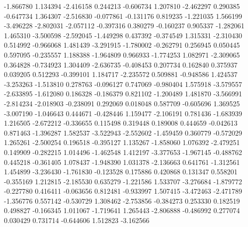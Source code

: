 -1.866780
1.134394
-2.416158
0.244213
-0.606734
1.207810
-2.462297
0.290385
-0.647734
1.364307
-2.516830
-0.077861
-0.131176
0.819235
-1.221035
1.566199
-3.496228
-2.802031
-2.057112
-0.397316
0.380279
-0.160237
0.905337
-1.282061
1.465310
-3.500598
-2.592045
-1.449298
0.437392
-0.374549
1.315331
-2.310430
0.514992
-0.966068
1.481439
-3.291915
-1.780002
-0.262791
0.256945
0.050445
0.597095
-0.235557
1.188388
-1.964809
0.966933
-1.774253
1.082971
-2.309065
0.364828
-0.734923
1.304409
-2.636735
-0.408453
0.207734
0.162840
0.375937
0.039205
0.512293
-0.399101
1.184717
-2.235572
0.509881
-0.948586
1.424537
-3.253263
-1.513810
0.278763
-0.096127
0.747069
-0.980404
1.575918
-3.579557
-2.633895
-1.612080
0.186328
-0.186379
0.821102
-1.200489
1.481870
-3.566991
-2.814234
-2.018903
-0.238091
0.292069
0.018048
0.587709
-0.605696
1.369525
-3.007190
-1.046643
0.444671
-0.428446
1.159477
-2.106191
0.781436
-1.683939
1.216505
-2.672212
-0.336655
0.115498
0.319448
0.189008
0.444659
-0.042613
0.871463
-1.396287
1.582537
-3.522943
-2.552602
-1.459459
0.360779
-0.572029
1.265261
-2.500254
0.196518
-0.395127
1.135267
-1.858060
1.076392
-2.479251
0.149909
-0.282215
1.014496
-1.462548
1.412197
-3.377653
-1.967145
-0.488762
0.445218
-0.361405
1.078437
-1.948390
1.031378
-2.136663
0.641761
-1.312561
1.454899
-3.236430
-1.761830
-0.123528
0.175886
0.420868
0.131347
0.558201
-0.355169
1.212815
-2.185530
0.635279
-1.221586
1.533707
-3.276684
-1.879772
-0.227780
0.416411
-0.063656
0.812481
-0.933997
1.507415
-3.472463
-2.471789
-1.356776
0.557142
-0.530729
1.308462
-2.753856
-0.384273
0.253330
0.182519
0.498827
-0.166345
1.011067
-1.719641
1.265443
-2.806888
-0.486992
0.277074
0.030429
0.731714
-0.644606
1.512823
-3.162566
